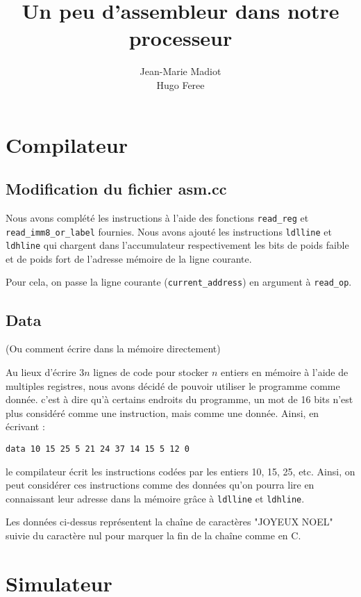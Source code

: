 \documentclass{article}
\author{Jean-Marie Madiot\\Hugo Feree}
\title{Un peu d'assembleur dans notre processeur}
\date{}
\begin{document}
 
\maketitle


\section{Compilateur} 

\subsection{Modification du fichier asm.cc} 

Nous avons complété les instructions à l'aide des fonctions {\tt read\_reg} et {\tt read\_imm8\_or\_label} fournies.
Nous avons ajouté les instructions {\tt ldlline} et {\tt ldhline} qui chargent dans l'accumulateur respectivement les bits de poids faible et de poids fort de l'adresse mémoire de la ligne courante.

Pour cela, on passe la ligne courante ({\tt current\_address}) en argument à {\tt read\_op}. 

\subsection{Data}
(Ou comment écrire dans la mémoire directement)

Au lieux d'écrire $3n$ lignes de code pour stocker $n$ entiers en mémoire à l'aide de multiples registres, nous avons décidé de pouvoir utiliser le programme comme donnée. c'est à dire qu'à certains endroits du programme, un mot de 16 bits n'est plus considéré comme une instruction, mais comme une donnée. Ainsi, en écrivant : 
\begin{verbatim}
data 10 15 25 5 21 24 37 14 15 5 12 0
\end{verbatim}
le compilateur écrit les instructions codées par les entiers 10, 15, 25, etc.
Ainsi, on peut considérer ces instructions comme des données qu'on pourra lire en connaissant leur adresse dans la mémoire grâce à {\tt ldlline} et {\tt ldhline}.

Les données ci-dessus représentent la chaîne de caractères "JOYEUX NOEL" suivie du caractère nul pour marquer la fin de la chaîne comme en C.

\section{Simulateur}
\end{document}
